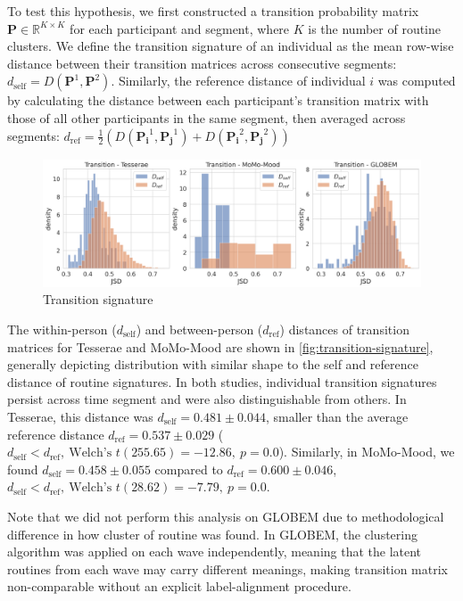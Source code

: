 \documentclass[pdflatex,sn-vancouver,Numbered]{bst/sn-jnl}%
\theoremstyle{thmstyleone}%
\theoremstyle{thmstyletwo}%
\theoremstyle{thmstylethree}%
\newcommand{\dself}[2]{$d_{\text{self}} = #1 \pm #2$}
\newcommand{\dref}[2]{$d_{\text{ref}} = #1 \pm #2$}
\newcommand{\dselfdrefp}[3]{$d_{\text{self}} < d_{\text{ref}},\ \text{Welch's } t(#1) = #2,\ p = #3$}
\begin{document}
To test this hypothesis, we first constructed a transition probability matrix 
\(\mathbf{P} \in \mathbb{R}^{K \times K}\) for each participant and segment, 
where \(K\) is the number of routine clusters. We define the transition signature of an individual as the mean row-wise 
distance between their transition matrices across consecutive segments: 
\(d_{\mathrm{self}} = 
D(\mathbf{P}^1, \mathbf{P}^{2}) \). Similarly, the reference distance of individual $i$ was computed by calculating the distance between each participant’s transition matrix with those of all other participants in the same segment, then averaged across 
segments: 
\(d_{\mathrm{ref}} = \frac{1}{2} (
D(\mathbf{P_i}^1, \mathbf{P_j}^{1}) + D(\mathbf{P_i}^2, \mathbf{P_j}^{2}))\)

\begin{figure}
    \centering
    \includegraphics[width=1\linewidth]{figures/combined_transition_dself_dref_jsd.png}
    \caption{Transition signature}
    \label{fig:transition-signature}
\end{figure}

The within-person (\(d_{\text{self}}\)) and between-person (\(d_{\text{ref}}\)) distances of transition matrices for Tesserae and MoMo-Mood are shown in \autoref{fig:transition-signature}, generally depicting distribution with similar shape to the self and reference distance of routine signatures. In both studies, individual transition signatures persist across time segment and were also distinguishable from others. In Tesserae, this distance was \dself{0.481}{0.044}, smaller than the average reference distance \dref{0.537}{0.029} (\dselfdrefp{255.65}{-12.86}{0.0}). Similarly, in MoMo-Mood, we found \dself{0.458}{0.055} compared to \dref{0.600}{0.046}, \dselfdrefp{28.62}{-7.79}{0.0}.

Note that we did not perform this analysis on GLOBEM due to methodological difference in how cluster of routine was found. In GLOBEM, the clustering algorithm was applied on each wave independently, meaning that the latent routines from each wave may carry different meanings, making transition matrix non-comparable without an explicit label-alignment procedure.
\end{document}

